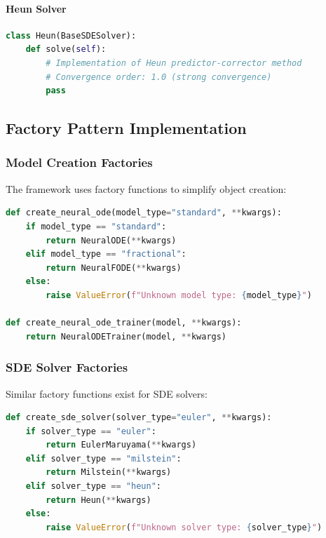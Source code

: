 \paragraph{Heun Solver}
\begin{lstlisting}[language=Python, caption=Heun Implementation]
class Heun(BaseSDESolver):
    def solve(self):
        # Implementation of Heun predictor-corrector method
        # Convergence order: 1.0 (strong convergence)
        pass
\end{lstlisting}

\subsection{Factory Pattern Implementation}

\subsubsection{Model Creation Factories}

The framework uses factory functions to simplify object creation:

\begin{lstlisting}[language=Python, caption=Neural ODE Factory Functions]
def create_neural_ode(model_type="standard", **kwargs):
    if model_type == "standard":
        return NeuralODE(**kwargs)
    elif model_type == "fractional":
        return NeuralFODE(**kwargs)
    else:
        raise ValueError(f"Unknown model type: {model_type}")

def create_neural_ode_trainer(model, **kwargs):
    return NeuralODETrainer(model, **kwargs)
\end{lstlisting}

\subsubsection{SDE Solver Factories}

Similar factory functions exist for SDE solvers:

\begin{lstlisting}[language=Python, caption=SDE Solver Factory Functions]
def create_sde_solver(solver_type="euler", **kwargs):
    if solver_type == "euler":
        return EulerMaruyama(**kwargs)
    elif solver_type == "milstein":
        return Milstein(**kwargs)
    elif solver_type == "heun":
        return Heun(**kwargs)
    else:
        raise ValueError(f"Unknown solver type: {solver_type}")
\end{lstlisting}

